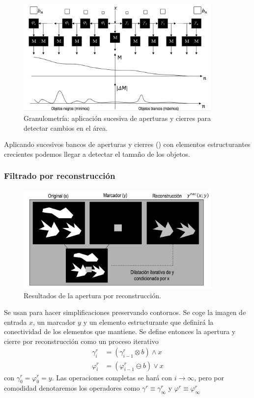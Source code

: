 \documentclass[nochap,palatino,notitlepage]{apuntes}
\begin{document}
\begin{figure}[hbtp]
\centering
\includegraphics[width=0.9\textwidth]{img/Granulometria.png}
\caption{Granulometría: aplicación sucesiva de aperturas y cierres para detectar cambios en el área.}
\label{fig:Granulometria}
\end{figure}

Aplicando sucesivos bancos de aperturas y cierres () con elementos estructurantes crecientes podemos llegar a detectar el tamaño de los objetos.

\subsubsection{Filtrado por reconstrucción}

\begin{figure}[hbtp]
\centering
\includegraphics[width=0.9\textwidth]{img/AperturaReconstruccion.png}
\caption{Resultados de la apertura por reconstrucción.}
\label{fig:AperturaReconstruccion}
\end{figure}

Se usan para hacer simplificaciones preservando contornos. Se coge la imagen de entrada $x$, un marcador $y$ y un elemento estructurante que definirá la conectividad de los elementos que mantiene. Se define entonces la apertura y cierre por reconstrucción como un proceso iterativo\begin{align*}
γ^r_i &= (γ^r_{i-1} \otimes b) \wedge x \\
φ^r_i &= (φ^r_{i-1} \ominus b) \vee x
\end{align*} con $γ^r_0 = φ^r_0 = y$. Las operaciones completas se hará con $i \to ∞$, pero por comodidad denotaremos los operadores como $γ^r \equiv γ^r_{∞}$ y $φ^r \equiv φ^r_{∞}$
\end{document}
